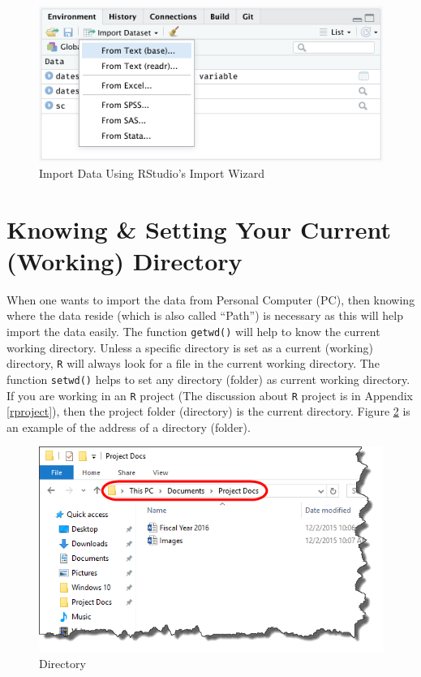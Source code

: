 \documentclass[
]{book}
\begin{document}
\begin{figure}

{\centering \includegraphics{images/import-data-using-environment} 

}

\caption{Import Data Using RStudio's Import Wizard}\label{fig:importwizard}
\end{figure}

\hypertarget{knowing-setting-your-current-working-directory}{%
\section{Knowing \& Setting Your Current (Working) Directory}\label{knowing-setting-your-current-working-directory}}

When one wants to import the data from Personal Computer (PC), then knowing where the data reside (which is also called ``Path'') is necessary as this will help import the data easily. The function \texttt{getwd()} will help to know the current working directory. Unless a specific directory is set as a current (working) directory, \texttt{R} will always look for a file in the current working directory. The function \texttt{setwd()} helps to set any directory (folder) as current working directory. If you are working in an \texttt{R} project (The discussion about \texttt{R} project is in Appendix \ref{rproject}), then the project folder (directory) is the current directory. Figure \ref{fig:directory} is an example of the address of a directory (folder).

\begin{figure}

{\centering \includegraphics{images/directory} 

}

\caption{Directory}\label{fig:directory}
\end{figure}
\end{document}
